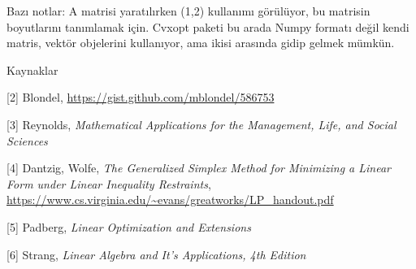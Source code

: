 \documentclass[12pt,fleqn]{article}\usepackage{../../common}
\begin{document}
Bazı notlar: A matrisi yaratılırken (1,2) kullanımı görülüyor, bu matrisin
boyutlarını tanımlamak için. Cvxopt paketi bu arada Numpy formatı değil kendi
matris, vektör objelerini kullanıyor, ama ikisi arasında gidip gelmek mümkün.

Kaynaklar

[2] Blondel, \url{https://gist.github.com/mblondel/586753}

[3] Reynolds, {\em Mathematical Applications for the Management, Life, and Social Sciences}

[4] Dantzig, Wolfe, {\em The Generalized Simplex Method for Minimizing a Linear Form under Linear Inequality Restraints}, \url{https://www.cs.virginia.edu/~evans/greatworks/LP_handout.pdf} %

[5] Padberg, {\em Linear Optimization and Extensions}

[6] Strang, {\em Linear Algebra and It's Applications, 4th Edition}
\end{document}
